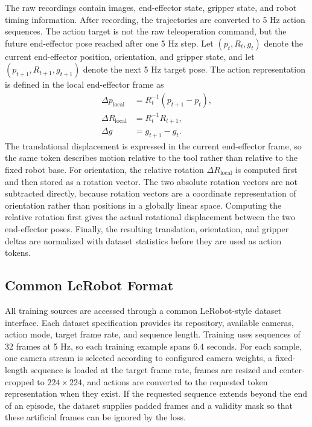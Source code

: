 \documentclass[12pt]{report}
\begin{document}
The raw recordings contain images, end-effector state, gripper state, and robot timing information. After recording, the trajectories are converted to 5 Hz action sequences. The action target is not the raw teleoperation command, but the future end-effector pose reached after one 5 Hz step.
Let $(p_t,R_t,g_t)$ denote the current end-effector position, orientation, and gripper state, and let $(p_{t+1},R_{t+1},g_{t+1})$ denote the next 5 Hz target pose. The action representation is defined in the local end-effector frame as
\begin{equation}
\label{eq:ur5-action-deltas}
\begin{aligned}
\Delta p_{\mathrm{local}} &= R_t^{-1}(p_{t+1}-p_t),\\
\Delta R_{\mathrm{local}} &= R_t^{-1}R_{t+1},\\
\Delta g &= g_{t+1}-g_t .
\end{aligned}
\end{equation}
The translational displacement is expressed in the current end-effector frame, so the same token describes motion relative to the tool rather than relative to the fixed robot base. For orientation, the relative rotation $\Delta R_{\mathrm{local}}$ is computed first and then stored as a rotation vector. The two absolute rotation vectors are not subtracted directly, because rotation vectors are a coordinate representation of orientation rather than positions in a globally linear space. Computing the relative rotation first gives the actual rotational displacement between the two end-effector poses. Finally, the resulting translation, orientation, and gripper deltas are normalized with dataset statistics before they are used as action tokens.

\subsection{Common LeRobot Format}
All training sources are accessed through a common LeRobot-style dataset interface. Each dataset specification provides its repository, available cameras, action mode, target frame rate, and sequence length. Training uses sequences of 32 frames at 5 Hz, so each training example spans 6.4 seconds. For each sample, one camera stream is selected according to configured camera weights, a fixed-length sequence is loaded at the target frame rate, frames are resized and center-cropped to $224 \times 224$, and actions are converted to the requested token representation when they exist. If the requested sequence extends beyond the end of an episode, the dataset supplies padded frames and a validity mask so that these artificial frames can be ignored by the loss.
\end{document}

